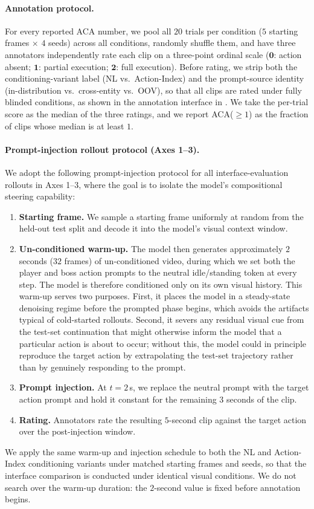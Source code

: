 \paragraph{Annotation protocol.}
For every reported ACA number, we pool all $20$ trials 
per condition ($5$ starting frames $\times$ $4$ seeds) 
across all conditions, randomly shuffle them, and have three 
annotators independently rate each clip on a three-point 
ordinal scale ($\mathbf{0}$: action absent; $\mathbf{1}$: 
partial execution; $\mathbf{2}$: full execution). 
Before rating, we strip both the conditioning-variant label 
(NL vs.\ Action-Index) and the prompt-source identity 
(in-distribution vs.\ cross-entity vs.\ OOV), so that 
all clips are rated under fully blinded conditions,
as shown in the annotation interface in . 
We take the per-trial score as the median of the three ratings, and we report ACA($\geq 1$) as the fraction of clips whose median is at least $1$.

\paragraph{Prompt-injection rollout protocol (Axes 1--3).}
We adopt the following prompt-injection protocol for all interface-evaluation rollouts in Axes 1--3, where the goal is to isolate the model's compositional steering capability:
\begin{enumerate}[leftmargin=*,topsep=2pt,itemsep=2pt,label=(\roman*)]
  \item \textbf{Starting frame.} We sample a starting frame uniformly at random from the held-out test split and decode it into the model's visual context window.
  \item \textbf{Un-conditioned warm-up.} The model then generates approximately $2$ seconds ($32$ frames) of un-conditioned video, during which we set both the player and boss action prompts to the neutral idle/standing token at every step. The model is therefore conditioned only on its own visual history. This warm-up serves two purposes. First, it places the model in a steady-state denoising regime before the prompted phase begins, which avoids the artifacts typical of cold-started rollouts. Second, it severs any residual visual cue from the test-set continuation that might otherwise inform the model that a particular action is about to occur; without this, the model could in principle reproduce the target action by extrapolating the test-set trajectory rather than by genuinely responding to the prompt.
  \item \textbf{Prompt injection.} At $t=2$\,s, we replace the neutral prompt with the target action prompt and hold it constant for the remaining $3$ seconds of the clip.
  \item \textbf{Rating.} Annotators rate the resulting $5$-second clip against the target action over the post-injection window.
\end{enumerate}
We apply the same warm-up and injection schedule to both the NL and Action-Index conditioning variants under matched starting frames and seeds, so that the interface comparison is conducted under identical visual conditions. We do not search over the warm-up duration: the $2$-second value is fixed before annotation begins.

